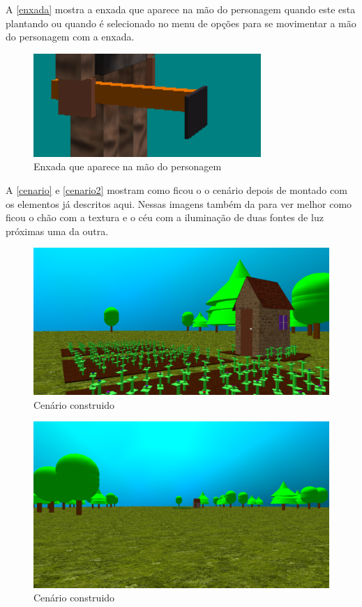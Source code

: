 \documentclass[
	12pt,				%
	openright,			%
	a4paper,			%
	english,			%
	french,				%
	spanish,			%
	brazil,				%
	]{abntex2}
\begin{document}
	A \autoref{enxada} mostra a enxada que aparece na mão do personagem quando este esta plantando ou quando é selecionado no menu de opções para se movimentar a mão do personagem com a enxada.

\begin{figure}[H]
\centering 
\caption{Enxada que aparece na mão do personagem } \label{enxada}
\includegraphics[scale=0.8]{imagens/enxada.png}
\end{figure}

 A \autoref{cenario} e \autoref{cenario2} mostram como ficou o o cenário  depois de montado com os elementos já descritos aqui. Nessas imagens também da para ver melhor como ficou o chão com a textura e o céu com a iluminação de duas fontes de luz próximas uma da outra. 

\begin{figure}[H]
\centering 
\caption{Cenário construido } \label{cenario}
\includegraphics[scale=0.4]{imagens/cenario.png}
\end{figure}

\begin{figure}[H]
\centering 
\caption{Cenário construido } \label{cenario2}
\includegraphics[scale=0.4]{imagens/cenario2.png}
\end{figure}
\end{document}
